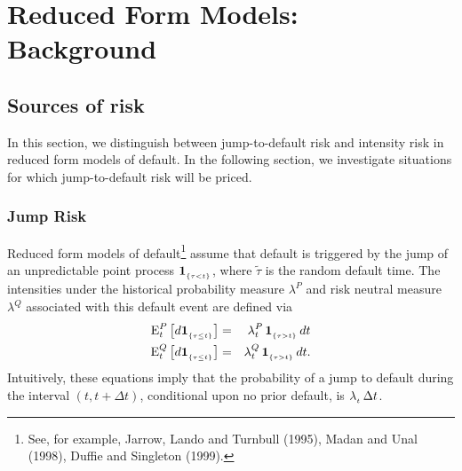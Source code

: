 \documentclass[titlepage,11pt]{article}
\def\by{\begin{eqnarray}}
\def\ey{\end{eqnarray}}
\begin{document}
\section{Reduced Form Models: Background\label{dis}}

\subsection{Sources of risk}
In this section, we distinguish between jump-to-default risk and intensity risk
in reduced form models of default.  In the following section, we investigate situations
for which jump-to-default risk will be priced.

\subsubsection{Jump Risk}
Reduced form models of default\footnote{See, for example, Jarrow, Lando and Turnbull
(1995), Madan and Unal (1998), Duffie and Singleton (1999).} assume that default is
triggered by the jump of an unpredictable point process ${\bf 1}_{_{{\left\{{\tau<t}\right\}}}}$, where $\tilde{\tau}$ is
the random default time.  The
intensities under the historical probability measure $\lambda^{P}$ and risk neutral measure $\lambda^{Q}$
associated with this default event are defined via
\by\label{indp}
\mbox{E}_t^{P} \left[ d\ind{\tau\leq t} \right] &=& \lambda^{P}_t \, \ind{\tau >t} \, dt\\
%
\mbox{E}_t^{Q} \left[ d\ind{\tau\leq t} \right] &=& \lambda^{Q}_t \, \ind{\tau >t} \,
dt.
\ey
Intuitively, these equations imply that the probability of a jump to default during
the interval $(t, t + \Delta t)$, conditional upon no prior default, is $\lambda_{_{{t}}} \, \Delta t$.
\end{document}
